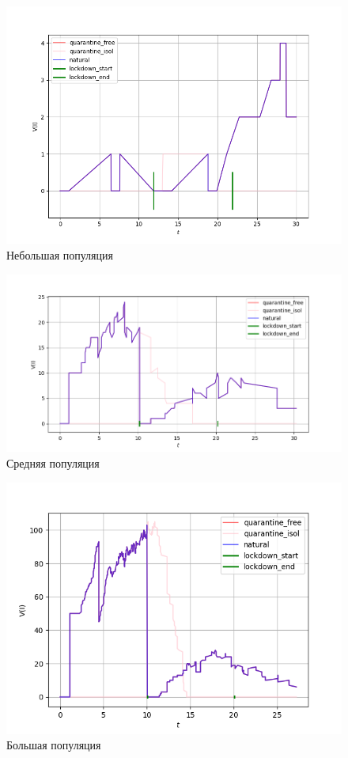 	\begin{figure}[h]
		\centering
		\includegraphics[width=0.8\linewidth, keepaspectratio]{../figs/basic_experiment_small_population}
		\caption{Небольшая популяция}
	\end{figure}
	
	\begin{figure}[h]
		\centering
		\includegraphics[width=0.8\linewidth, keepaspectratio]{../figs/basic_experiment_medium_population.png}
		\caption{Средняя популяция}
	\end{figure}
	
	\begin{figure}[h]
		\centering
		\includegraphics[width=0.8\linewidth, keepaspectratio]{../figs/basic_experiment_big_population.png}
		\caption{Большая популяция}
	\end{figure}

